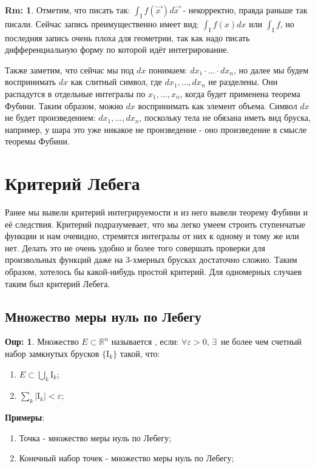 \documentclass[12pt]{article}
\newcommand{\MR}{\mathbb{R}}
\newcommand{\MI}{\mathrm{I}}
\newcommand{\VE}{\varepsilon}
\theoremstyle{definition}
\newtheorem{defn}{Опр:}
\newtheorem{rem}{Rm:}
\newcommand{\vecm}[1]{\overrightarrow{#1\,}}
\begin{document}
\begin{rem}
	Отметим, что писать так: $\int_{\MI}f(\vecm{x})d\vecm{x}$ - некорректно, правда раньше так писали. Сейчас запись преимущественно имеет вид: $\int_{\MI}f(x)dx$ или $\int_{\MI}f$, но последняя запись очень плоха для геометрии, так как надо писать дифференциальную форму по которой идёт интегрирование. 
	
	Также заметим, что сейчас мы под $dx$ понимаем: $dx_1{\cdot}\dotsc{\cdot}dx_n$, но далее мы будем воспринимать $dx$ как слитный символ, где $dx_1, \dotsc ,dx_n$ не разделены. Они распадутся в отдельные интегралы по $x_1,\dotsc,x_n$, когда будет применена теорема Фубини. Таким образом, можно $dx$ воспринимать как элемент объема. Символ $dx$ не будет произведением: $dx_1,\dotsc, dx_n$, поскольку тела не обязана иметь вид бруска, например, у шара это уже никакое не произведение -  оно произведение в смысле теоремы Фубини.
\end{rem}
\newpage

\section*{Критерий Лебега}

Ранее мы вывели критерий интегрируемости и из него вывели теорему Фубини и её следствия. Критерий подразумевает, что мы легко умеем строить ступенчатые функции и нам очевидно, стремятся интегралы от них к одному и тому же или нет. Делать это не очень удобно и более того совершать проверки для произвольных функций даже на $3$-хмерных брусках достаточно сложно. Таким образом, хотелось бы какой-нибудь простой критерий. Для одномерных случаев таким был критерий Лебега.

\subsection*{Множество меры нуль по Лебегу}
\begin{defn}
	Множество $E \subset \MR^n$ называется , если: $\forall \VE > 0, \, \exists \, $ не более чем счетный набор замкнутых брусков $\{\MI_k\}$ такой, что:
	\begin{enumerate}[label=\arabic*)]
		\item $E \subset \bigcup_k \MI_k$;
		\item $\sum_k |\MI_k| < \VE$;
	\end{enumerate}
\end{defn}
\textbf{Примеры}: 
\begin{enumerate}[label=\arabic*)]
	\item Точка - множество меры нуль по Лебегу;
	\item Конечный набор точек - множество меры нуль по Лебегу;
\end{enumerate}
\end{document}
